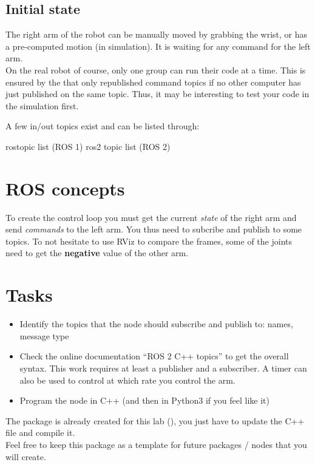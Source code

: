 \documentclass{ecnreport}
\begin{document}
\subsection{Initial state}

The right arm of the robot can be manually moved by grabbing the wrist, or has a pre-computed motion (in simulation). 
It is waiting for any command for the left arm.\\

On the real robot of course, only one group can run their code at a time. This is ensured by the  that only republished command topics if no other computer has just published on the same topic. Thus, it may be interesting to test your code in the simulation first.

A few in/out topics exist and can be listed through:
\begin{bashcodelarge}
rostopic list (ROS 1)
ros2 topic list (ROS 2)
\end{bashcodelarge}

\section{ROS concepts}

To create the control loop you must get the current \emph{state} of the right arm and send \emph{commands} to 
the left arm. You thus need to subcribe and publish to some topics. To not hesitate to use RViz to compare the frames, some of the joints need to get the \textbf{negative}
value of the other arm.

\section{Tasks}

\begin{itemize}
\item Identify the topics that the node should subscribe and publish to: names, message type
\item Check the online documentation ``ROS 2 C++ topics'' to get the overall syntax. This work requires at least a publisher and a subscriber. A timer can also be used to control at which rate you control the arm.
\item Program the node in C++ (and then in Python3 if you feel like it)
\end{itemize}

The package is already created for this lab (), you just have to update the C++ file and compile it.\\
Feel free to keep this package as a template for future packages / nodes that you will create.
\end{document}
